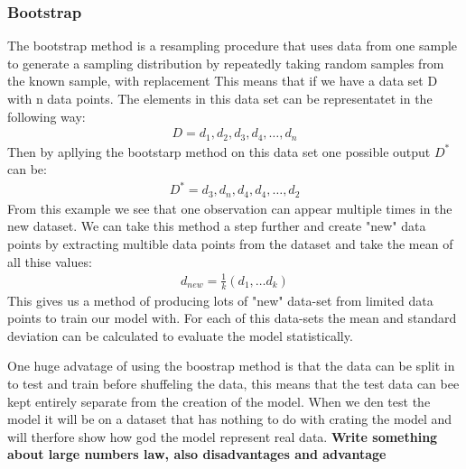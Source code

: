 \subsubsection{Bootstrap} 
\noindent The bootstrap method is a resampling procedure that uses data from one 
sample to generate a sampling distribution by repeatedly taking random 
samples from the known sample, with replacement %
This means that if we have a data set D with n data points.
The elements in this data set can be representatet in the following way:
\begin{align}
    D = {d_1, d_2, d_3, d_4, \dots, d_n}
\end{align}
Then by apllying the bootstarp method on this data set one possible output $D^{*}$ can be:
\begin{align}
    D^{*} = {d_3, d_n, d_4, d_4 , \dots, d_2}
\end{align}
From this example we see that one observation can appear multiple times in the new dataset.
We can take this method a step further and create "new" data points by extracting multible data points from 
the dataset and take the mean of all thise values:
\begin{align}
    d_{new} = \frac{1}{k}(d_1, \dots d_k)
\end{align}
This gives us a method of producing lots of "new" data-set from 
limited data points to train our model with. For each of this data-sets
the mean and standard deviation can be calculated to evaluate the model statistically. %


One huge advatage of using the boostrap method is that the data can be split in to 
test and train before shuffeling the data, this means that the test data can bee kept 
entirely separate from the creation of the model. When we den test the model it will
be on a dataset that has nothing to do with crating the model and will therfore show
how god the model represent real data. 
\textbf{Write something about large numbers law, also disadvantages and advantage}


